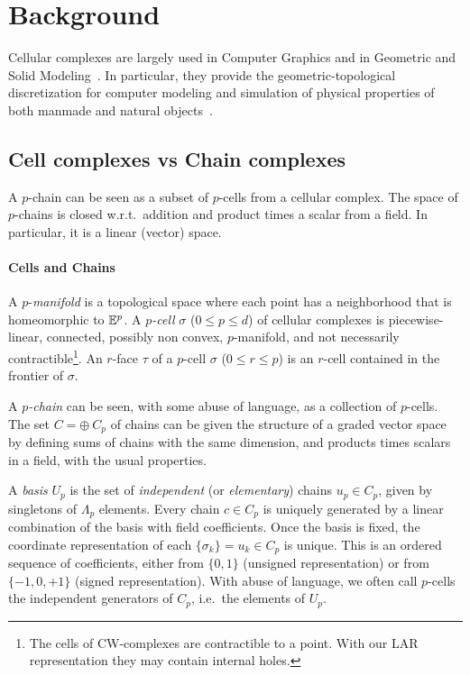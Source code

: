 \section{Background}\label{background}

Cellular complexes are largely used in Computer Graphics and in Geometric and Solid Modeling~\cite{Elter:10.1007/978-3-642-78114-8_12}. In particular, they provide the geometric-topological discretization for computer modeling and simulation of physical properties of both manmade and natural objects~\cite{DiCarlo:2009:DPU:1629255.1629273,ieee-tase}.

\subsection{Cell complexes vs Chain complexes}
\label{cell-complexes-vs-chain-complexes}

A \(p\)-chain can be seen as a subset of \(p\)-cells from a cellular
complex. The space of \(p\)-chains is closed
w.r.t.~addition and product times a scalar from a field. In particular, it is a linear (vector) space.

\paragraph{Cells and Chains}\label{sec:chain}
A $p$-\emph{manifold} is a topological space where each point has a neighborhood
that is homeomorphic to $\mathbb{E}^p$. A \emph{$p$-cell} $\sigma$ ($0\leq p\leq d$) of cellular complexes is piecewise-linear, connected, possibly non convex, $p$-manifold, and not necessarily contractible\footnote{The cells of CW-complexes are contractible to a point. With our LAR representation they may contain internal holes.}. An
$r$-face $\tau$ of a $p$-cell $\sigma$ ($0\leq r\leq p$) is an $r$-cell contained
in the frontier of $\sigma$.


A \emph{$p$-chain} can be seen, with some abuse of language, as a collection of $p$-cells.
The set $C=\oplus\ C_p$ of chains can be given the structure of a graded vector space  by
defining sums of chains with the same dimension, and products times scalars in a
field, with the usual properties.

A \emph{basis} $U_p$  is the set of \emph{independent} (or \emph{elementary}) chains $u_p \in C_p$, given
by singletons of $\Lambda_p$ elements. Every chain $c\in C_p$ is uniquely generated by
a linear combination of the basis with field coefficients. Once  the  basis is fixed, the coordinate
representation of each $\{\sigma_k\} = u_k \in C_p$ is unique. This is an ordered
sequence of coefficients, either from $\{0,1\}$ (unsigned representation) or from
$\{-1,0,+1\}$ (signed representation). With abuse of language, we
often call $p$-cells the independent generators of $C_p$, {i.e.}~the elements of
$U_p$.


